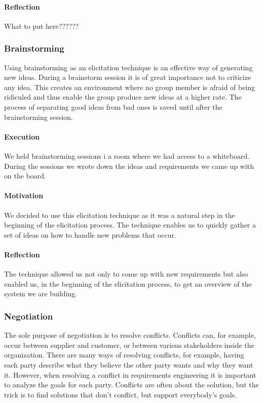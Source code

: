 \documentclass[10pt]{article}
\begin{document}
\paragraph{Reflection}
\hfill \break
What to put here??????

\subsubsection{Brainstorming}
Using brainstorming as an elicitation technique is an effective way of generating new ideas. During a brainstorm session it is of great importance not to criticize any idea. This creates an environment where no group member is afraid of being ridiculed and thus enable the group produce new ideas at a higher rate.
The process of separating good ideas from bad ones is saved until after the brainstorming session.
\paragraph{Execution}
\hfill \break
We held brainstorming sessions i a room where we had access to a whiteboard. During the sessions we wrote down the ideas and requirements we came up with on the board.
\paragraph{Motivation}
\hfill \break
We decided to use this elicitation technique as it was a natural step in the beginning of the elicitation process. The technique enables us to quickly gather a set of ideas on how to handle new problems that occur.
\paragraph{Reflection}
\hfill \break
The technique allowed us not only to come up with new requirements but also enabled us, in the beginning of the elicitation process, to get an overview of the system we are building.


\subsubsection{Negotiation}
The sole purpose of negotiation is to resolve conflicts. Conflicts can, for example, occur between supplier and customer, or between various stakeholders inside the organization. There are many ways of resolving conflicts, for example, having each party describe what they believe the other party wants and why they want it. However, when resolving a conflict in requirements engineering it is important to analyze the goals for each party. Conflicts are often about the solution, but the trick is to find solutions that don’t conflict, but support everybody’s goals.
\end{document}
